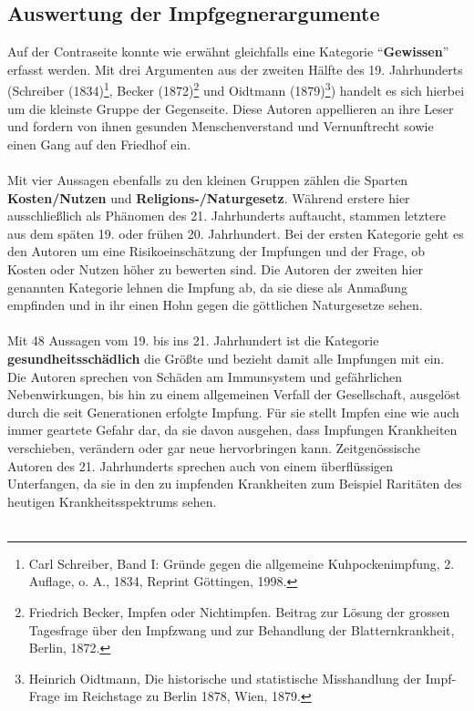 \documentclass[
    a4paper,
    12pt,
    hyphens,
    chapterprefix=true,
    headheight=33pt,
    footheight=29pt,
    headings=optiontohead, %
]{scrartcl}
\begin{document}
{\subsection{Auswertung der Impfgegnerargumente}
Auf der Contraseite konnte wie erwähnt gleichfalls eine Kategorie "`\textbf{Gewissen}"' erfasst werden. Mit drei Argumenten aus der zweiten Hälfte des 19. Jahrhunderts (Schreiber (1834)\footnote{Carl Schreiber, Band I: Gründe gegen die allgemeine Kuhpockenimpfung, 2. Auflage, o. A., 1834, Reprint Göttingen, 1998.}, Becker (1872)\footnote{Friedrich Becker, Impfen oder Nichtimpfen. Beitrag zur Lösung der grossen Tagesfrage über den Impfzwang und zur Behandlung der Blatternkrankheit, Berlin, 1872.} und Oidtmann (1879)\footnote{Heinrich Oidtmann, Die historische und statistische Misshandlung der Impf-Frage im Reichstage zu Berlin 1878, Wien, 1879.}) handelt es sich hierbei um die kleinste Gruppe der Gegenseite. Diese Autoren appellieren an ihre Leser und fordern von ihnen gesunden Menschenverstand und Vernunftrecht sowie einen Gang auf den Friedhof ein.\\
\\
Mit vier Aussagen ebenfalls zu den kleinen Gruppen zählen die Sparten \textbf{Kosten/Nutzen} und \textbf{Religions-/Naturgesetz}. Während erstere hier ausschließlich als Phänomen des 21. Jahrhunderts auftaucht, stammen letztere aus dem späten 19. oder frühen 20. Jahrhundert. Bei der ersten Kategorie geht es den Autoren um eine Risikoeinschätzung der Impfungen und der Frage, ob Kosten oder Nutzen höher zu bewerten sind. Die Autoren der zweiten hier genannten Kategorie lehnen die Impfung ab, da sie diese als Anmaßung empfinden und in ihr einen Hohn gegen die göttlichen Naturgesetze sehen.\\
\\
Mit 48 Aussagen vom 19. bis ins 21. Jahrhundert ist die Kategorie \textbf{gesundheitsschädlich} die Größte  und bezieht damit alle Impfungen mit ein. Die Autoren sprechen von Schäden am Immunsystem und gefährlichen Nebenwirkungen, bis hin zu einem allgemeinen Verfall der Gesellschaft, ausgelöst durch die seit Generationen erfolgte Impfung. Für sie stellt Impfen eine wie auch immer geartete Gefahr dar, da sie davon ausgehen, dass Impfungen Krankheiten verschieben, verändern oder gar neue hervorbringen kann. Zeitgenössische Autoren des 21. Jahrhunderts sprechen auch von einem überflüssigen Unterfangen, da sie in den zu impfenden Krankheiten zum Beispiel Raritäten des heutigen Krankheitsspektrums sehen.\\
\\
}
\end{document}
